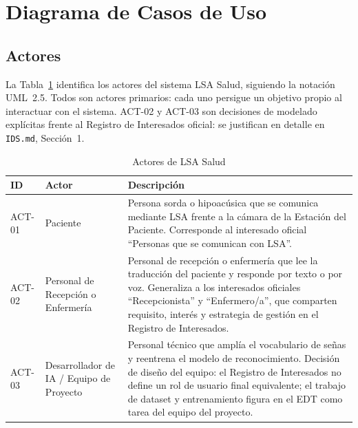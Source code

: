 \section{Diagrama de Casos de Uso}

\subsection{Actores}

La Tabla~\ref{tab:actores-cu} identifica los actores del sistema LSA Salud,
siguiendo la notación UML~2.5. Todos son actores primarios: cada uno
persigue un objetivo propio al interactuar con el sistema. ACT-02 y ACT-03
son decisiones de modelado explícitas frente al Registro de Interesados
oficial: se justifican en detalle en \texttt{IDS.md}, Sección~1.

\begin{table}[H]
    \centering
    \caption{Actores de LSA Salud}
    \label{tab:actores-cu}
    \begin{tabularx}{\textwidth}{l l X}
        \toprule
        \textbf{ID} & \textbf{Actor} & \textbf{Descripción} \\
        \midrule
        ACT-01 & Paciente & Persona sorda o hipoacúsica que se comunica mediante LSA frente a la cámara de la Estación del Paciente. Corresponde al interesado oficial ``Personas que se comunican con LSA''. \\
        ACT-02 & Personal de Recepción o Enfermería & Personal de recepción o enfermería que lee la traducción del paciente y responde por texto o por voz. Generaliza a los interesados oficiales ``Recepcionista'' y ``Enfermero/a'', que comparten requisito, interés y estrategia de gestión en el Registro de Interesados. \\
        ACT-03 & Desarrollador de IA / Equipo de Proyecto & Personal técnico que amplía el vocabulario de señas y reentrena el modelo de reconocimiento. Decisión de diseño del equipo: el Registro de Interesados no define un rol de usuario final equivalente; el trabajo de dataset y entrenamiento figura en el EDT como tarea del equipo del proyecto. \\
        \bottomrule
    \end{tabularx}
\end{table}

